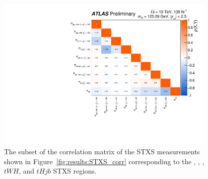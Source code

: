 \begin{figure}[htb!]
    \centering
    \includegraphics[width=0.95\textwidth]{figures/couplings_chapter/corrmat_STXS_obs_VH_ttH.pdf}
    \caption{The subset of the correlation matrix of the STXS measurements shown in Figure~\ref{fig:results:STXS_corr} corresponding to the \qqtoHll, \qqtoHln, \ttH, $tWH$, and $tHjb$ STXS regions.}
    \label{fig:correlationVHttH}
\end{figure}


